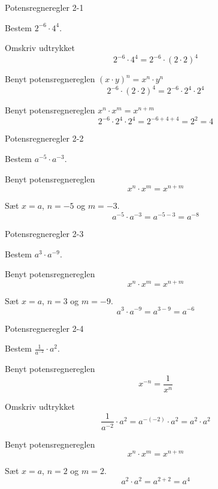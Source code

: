 \documentclass{article}
\begin{document}
\tableofcontents
\newpage

\begin{exercise}{Potensregneregler 2-1}

Bestem $2^{-6} \cdot 4^4$.


\hint
Omskriv udtrykket
\[
2^{-6} \cdot 4^4 = 2^{-6} \cdot (2 \cdot 2)^4
\]

\hint

Benyt potensregnereglen $(x \cdot y)^n = x^n \cdot y^n$
\[
2^{-6} \cdot (2 \cdot 2)^4 = 2^{-6} \cdot 2^4 \cdot 2^4
\]

\hint
Benyt potensregnereglen $ x^n \cdot x^m = x^{n + m}$
\[
2^{-6} \cdot 2^4 \cdot 2^4 = 2^{-6 + 4+4} = 2^2 = 4
\]

\end{exercise}

\newpage

\begin{exercise}{Potensregneregler 2-2}

Bestem $a^{-5} \cdot a^{-3}$.


\hint

Benyt potensregnereglen
\[
x^n \cdot x^m = x^{n + m}
\]
\hint

Sæt $x=a$, $n=-5$ og $m=-3$.
\[
a^{-5} \cdot a^{-3} = a^{-5 - 3} = a^{-8}
\]

\end{exercise}

\newpage

\begin{exercise}{Potensregneregler 2-3}

Bestem $a^{3} \cdot a^{-9}$.


\hint
Benyt potensregnereglen
\[
x^n \cdot x^m = x^{n + m}
\]

\hint

Sæt $x=a$, $n=3$ og $m=-9$.
\[
a^{3} \cdot a^{-9} = a^{3 - 9} = a^{-6}
\]

\end{exercise}

\newpage

\begin{exercise}{Potensregneregler 2-4}

Bestem $\frac{1}{a^{-2}} \cdot a^{2}$.


\hint
Benyt potensregnereglen
\[
 x^{-n} = \frac{1}{x^{n}}
\]

\hint

Omskriv udtrykket
\[
\frac{1}{a^{-2}} \cdot a^{2} = a^{-(-2)} \cdot a^2 = a^2 \cdot a^2
\]

\hint
Benyt potensregnereglen
\[
x^n \cdot x^m = x^{n + m}
\]

\hint

Sæt $x=a$, $n=2$ og $m=2$.
\[
a^{2} \cdot a^{2} = a^{2 + 2} = a^{4}
\]

\end{exercise}
\end{document}
